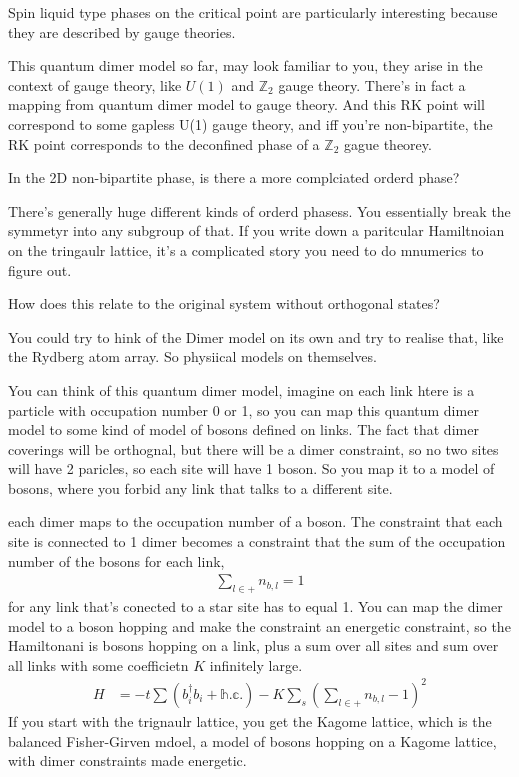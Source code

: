 Spin liquid type phases on the critical point are particularly interesting
because they are described by gauge theories.

This quantum dimer model so far,
may look familiar to you,
they arise in the context of gauge theory,
like $U(1)$ and $\mathbb{Z}_2$ gauge theory.
There's in fact a mapping from quantum dimer model to gauge theory.
And this RK point will correspond to some gapless U(1) gauge theory,
and iff you're non-bipartite,
the RK point corresponds to the deconfined phase of a $\mathbb{Z}_2$ gague
theorey.

\begin{question}
    In the 2D non-bipartite phase,
    is there a more complciated orderd phase?
\end{question}
There's generally huge different kinds of orderd phasess.
You essentially break the symmetyr into any subgroup of that.
If you write down a paritcular Hamiltnoian on the tringaulr lattice,
it's a complicated story you need to do mnumerics to figure out.

\begin{question}
    How does this relate to the original system without orthogonal states?
\end{question}
You could try to hink of the Dimer model on its own and try to realise that,
like the Rydberg atom array.
So physiical models on themselves.

You can think of this quantum dimer model,
imagine on each link htere is a particle with occupation number 0 or 1,
so you can map this quantum dimer model to some kind of model of bosons defined
on links.
The fact that dimer coverings will be orthognal,
but there will be a dimer constraint,
so no two sites will have 2 paricles,
so each site will have 1 boson.
So you map it to a model of bosons,
where you forbid any link that talks to a different site.

each dimer maps to the occupation number of a boson.
The constraint that each site is connected to 1 dimer becomes a constraint that
the sum of the occupation number of the bosons for each link,
\begin{align}
    \sum_{l \in +} n_{b, l} = 1
\end{align}
for any link that's conected to a star site has to equal 1.
You can map the dimer model to a boson hopping and make the constraint an
energetic constraint,
so the Hamiltonani is bosons hopping on a link,
plus a sum over all sites and sum over all links with some coefficietn $K$
infinitely large.
\begin{align}
    H &=
    -t \sum\left( b_i^\dagger b_i + \mathbb{h.c.}\right) 
    - K
    \sum_s
    \left( 
    \sum_{l \in +}
    n_{b,l} - 1
    \right)^2
\end{align}
If you start with the trignaulr lattice,
you get the Kagome lattice,
which is the balanced Fisher-Girven mdoel,
a model of bosons hopping on a Kagome lattice,
with dimer constraints made energetic.

